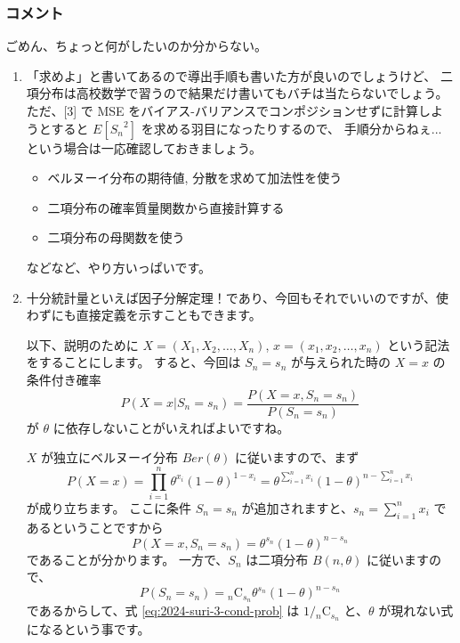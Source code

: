 \documentclass[./main.tex]{subfiles}
\begin{document}
    \subsubsection*{コメント}
    ごめん、ちょっと何がしたいのか分からない。
    \begin{enumerate}
        \item 「求めよ」と書いてあるので導出手順も書いた方が良いのでしょうけど、
        二項分布は高校数学で習うので結果だけ書いてもバチは当たらないでしょう。
        ただ、[3] で MSE をバイアス-バリアンスでコンポジションせずに計算しようとすると $E[{S_n}^2]$ を求める羽目になったりするので、
        手順分からねぇ...という場合は一応確認しておきましょう。

        \begin{itemize}
            \item ベルヌーイ分布の期待値, 分散を求めて加法性を使う
            \item 二項分布の確率質量関数から直接計算する
            \item 二項分布の母関数を使う
        \end{itemize}
        などなど、やり方いっぱいです。

        \item 十分統計量といえば因子分解定理！であり、今回もそれでいいのですが、使わずにも直接定義を示すこともできます。
        
        以下、説明のために $X = (X_1, X_2, \dots, X_n)$, $x = (x_1, x_2, \dots, x_n)$ という記法をすることにします。
        すると、今回は $S_n = s_n$ が与えられた時の $X = x$ の条件付き確率
        \begin{equation}
            P ( X = x \vert S_n = s_n)
                = \frac{P(X = x, S_n = s_n)}{P(S_n = s_n)}
                \label{eq:2024-suri-3-cond-prob}
        \end{equation}
        が $\theta$ に依存しないことがいえればよいですね。

        $X$ が独立にベルヌーイ分布 $Ber(\theta)$ に従いますので、まず
        \begin{equation*}
            P(X = x) = \prod_{i=1}^{n} \theta^{x_i} (1 - \theta)^{1 - x_i}
                = \theta^{\sum_{i=1}^n x_i}
                    (1 - \theta)^{ n - \sum_{i=1}^n x_i}
        \end{equation*}
        が成り立ちます。
        ここに条件 $S_n = s_n$ が追加されますと、$s_n = \sum_{i=1}^{n} x_i$ であるということですから
        \begin{equation*}
            P(X = x, S_n = s_n)
                = \theta^{s_n}  (1 - \theta)^{n - s_n}
        \end{equation*}
        であることが分かります。
        一方で、$S_n$ は二項分布 $B (n, \theta)$ に従いますので、
        \begin{equation*}
            P (S_n = s_n) = {}_{n} \mathrm{C}_{s_n} \theta^{s_n} (1 - \theta)^{n - s_n}
        \end{equation*}
        であるからして、式 \eqref{eq:2024-suri-3-cond-prob} は $1 / {}_n \mathrm{C}_{s_n}$ と、$\theta$ が現れない式になるという事です。


\end{enumerate}
\end{document}
